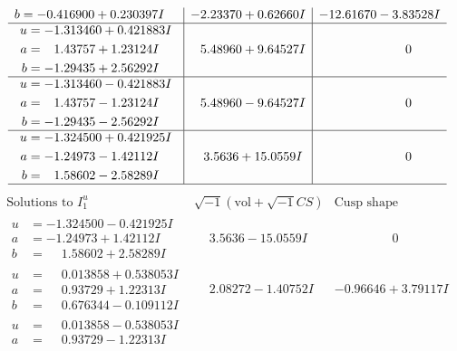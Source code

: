 \documentclass[1p]{elsarticle_modified}
\theoremstyle{definition}
\newcommand{\I}{\sqrt{-1}}
\begin{document}
$$\begin{array}{c|c|c}
\begin{aligned}
b &= -0.416900 + 0.230397 I\end{aligned}
 & -2.23370 + 0.62660 I & -12.61670 - 3.83528 I \\ \hline\begin{aligned}
u &= -1.313460 + 0.421883 I \\
a &= \phantom{-}1.43757 + 1.23124 I \\
b &= -1.29435 + 2.56292 I\end{aligned}
 & \phantom{-}5.48960 + 9.64527 I & \phantom{-0.000000 } 0 \\ \hline\begin{aligned}
u &= -1.313460 - 0.421883 I \\
a &= \phantom{-}1.43757 - 1.23124 I \\
b &= -1.29435 - 2.56292 I\end{aligned}
 & \phantom{-}5.48960 - 9.64527 I & \phantom{-0.000000 } 0 \\ \hline\begin{aligned}
u &= -1.324500 + 0.421925 I \\
a &= -1.24973 - 1.42112 I \\
b &= \phantom{-}1.58602 - 2.58289 I\end{aligned}
 & \phantom{-}3.5636 + 15.0559 I & \phantom{-0.000000 } 0\\
 \hline 
 \end{array}$$\newpage$$\begin{array}{c|c|c}  
\text{Solutions to }I^u_{1}& \I (\text{vol} + \sqrt{-1}CS) & \text{Cusp shape}\\
 \hline 
\begin{aligned}
u &= -1.324500 - 0.421925 I \\
a &= -1.24973 + 1.42112 I \\
b &= \phantom{-}1.58602 + 2.58289 I\end{aligned}
 & \phantom{-}3.5636 - 15.0559 I & \phantom{-0.000000 } 0 \\ \hline\begin{aligned}
u &= \phantom{-}0.013858 + 0.538053 I \\
a &= \phantom{-}0.93729 + 1.22313 I \\
b &= \phantom{-}0.676344 - 0.109112 I\end{aligned}
 & \phantom{-}2.08272 - 1.40752 I & -0.96646 + 3.79117 I \\ \hline\begin{aligned}
u &= \phantom{-}0.013858 - 0.538053 I \\
a &= \phantom{-}0.93729 - 1.22313 I \\

\end{aligned}
\end{array}$$
\end{document}
